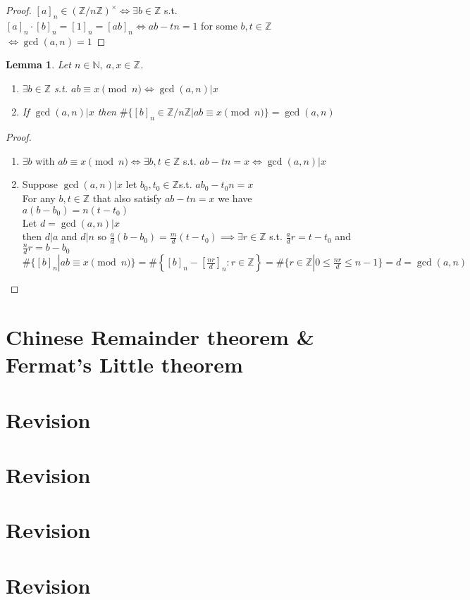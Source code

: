 \documentclass{book}
\newtheorem*{lem}{Lemma}
\theoremstyle{definition}
\newcommand{\ZZ}{\mathbb{Z}}
\newcommand{\NN}{\mathbb{N}}
\begin{document}
\begin{proof}
$[a]_n\in (\ZZ /n\ZZ)^\times \iff \exists b \in \ZZ$ s.t. $[a]_n\cdot [b]_n=[1]_n=[ab]_n \iff ab-tn=1$ for some $b,t\in\ZZ$ $\iff \gcd(a,n)=1$
\end{proof}
\begin{lem}
Let $n\in\NN ,\ a,x \in\ZZ$.
\begin{enumerate}
\item $\exists b \in\ZZ$ s.t. $ab \equiv x\pmod{n} \iff \gcd(a,n)|x$
\item If $\gcd(a,n)|x$ then $\#\{[b]_n\in\ZZ/n\ZZ|ab\equiv x\pmod{n}\} =\gcd(a,n)$
\end{enumerate}
\end{lem}
\begin{proof}
\begin{enumerate}
\item $\exists b$ with $ab \equiv x\pmod{n} \iff \exists b,t \in\ZZ$ s.t. $ab-tn=x \iff \gcd(a,n)|x$
\item Suppose $\gcd(a,n)|x$ let $b_0, t_0\in\ZZ$s.t. $ab_0-t_0n=x$ \\
For any $b,t\in\ZZ$ that also satisfy $ab-tn=x$ we have $a(b-b_0)=n(t-t_0)$ \\
Let $d=\gcd(a,n)|x$ \\
then $d|a$ and $d|n$ so $\frac a d (b-b_0)=\frac m d (t-t_0) \implies \exists r \in\ZZ$ s.t. $\frac a d r = t-t_0$ and $\frac n d r = b-b_0$ \\
$\#\{[b]_n|ab\equiv x \pmod{n}\} = \#\left\{[b]_n - \left[ \frac{nr}{d}\right]_n : r\in\ZZ\right\} = \#\{r\in\ZZ|0\leq \frac{nr}{d} \leq n-1\} = d = \gcd(a,n)$
\end{enumerate}
\end{proof}
\chapter{Chinese Remainder theorem \& Fermat's Little theorem}

\chapter{Revision}

\chapter{Revision}

\chapter{Revision}

\chapter{Revision}
\end{document}
